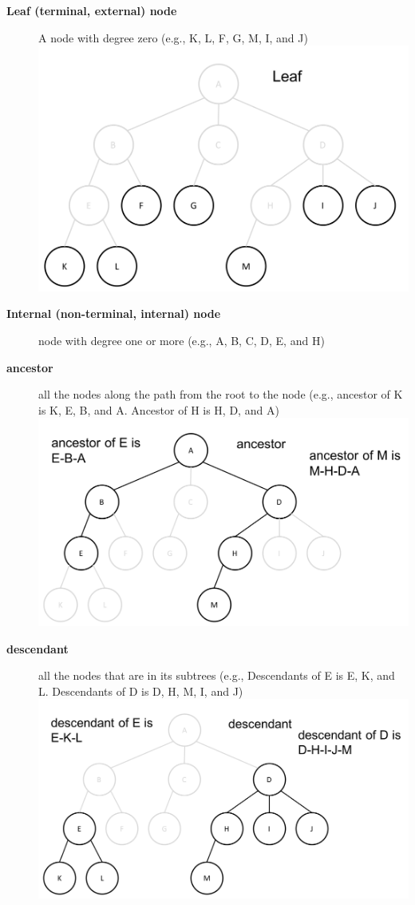 \documentclass[newPxFont,sthlmFooter,nooffset]{beamer}
\begin{document}
\begin{frame}[t, allowframebreaks]
\begin{description}
  \item[\textbf{Leaf (terminal, external) node}] A node with degree
    zero (e.g., K, L, F, G, M, I, and J)\\
\includegraphics[height=0.3\textheight]{./figures/fig02_def_leaf.png}
  \item[\textbf{Internal (non-terminal, internal) node}] node with
    degree one or more (e.g., A, B, C, D, E, and H)
  \item[\textbf{ancestor}] all the nodes along the path from the root
    to the node (e.g., ancestor of K is K, E, B, and A. Ancestor of H
    is H, D, and A)\\
\includegraphics[height=0.3\textheight]{./figures/fig02_def_ancestor.png}
  \item[\textbf{descendant}] all the nodes that are in its subtrees
    (e.g., Descendants of E is E, K, and L. Descendants of D is D, H,
    M, I, and J)\\
\includegraphics[height=0.3\textheight]{./figures/fig02_def_descendant.png}

\end{description}
\end{frame}
\end{document}
